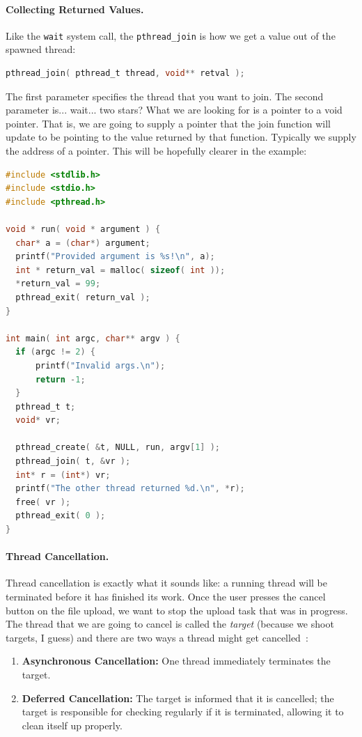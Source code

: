 \documentclass[a4paper]{report}
\begin{document}
\begin{appendices}
\paragraph{Collecting Returned Values.} Like the \texttt{wait} system call, the \texttt{pthread\_join} is how we get a value out of the spawned thread:

\begin{lstlisting}[language=C]
pthread_join( pthread_t thread, void** retval );
\end{lstlisting}

The first parameter specifies the thread that you want to join. The second parameter is... wait... two stars? What we are looking for is a pointer to a void pointer. That is, we are going to supply a pointer that the join function will update to be pointing to the value returned by that function. Typically we supply the address of a pointer. This will be hopefully clearer in the example:

\begin{lstlisting}[language=C]
#include <stdlib.h>
#include <stdio.h>
#include <pthread.h>

void * run( void * argument ) { 
  char* a = (char*) argument;
  printf("Provided argument is %s!\n", a); 
  int * return_val = malloc( sizeof( int )); 
  *return_val = 99; 
  pthread_exit( return_val );
}

int main( int argc, char** argv ) { 
  if (argc != 2) {
      printf("Invalid args.\n");
      return -1; 
  }
  pthread_t t;
  void* vr; 
  
  pthread_create( &t, NULL, run, argv[1] );
  pthread_join( t, &vr );
  int* r = (int*) vr; 
  printf("The other thread returned %d.\n", *r);
  free( vr );
  pthread_exit( 0 );
}
\end{lstlisting}

\paragraph{Thread Cancellation.}
Thread cancellation is exactly what it sounds like: a running thread will be terminated before it has finished its work. Once the user presses the cancel button on the file upload, we want to stop the upload task that was in progress. The thread that we are going to cancel is called the \textit{target} (because we shoot targets, I guess) and there are two ways a thread might get cancelled~\cite{osc}:

\begin{enumerate}
	\item \textbf{Asynchronous Cancellation:} One thread immediately terminates the target.
	\item \textbf{Deferred Cancellation:} The target is informed that it is cancelled; the target is responsible for checking regularly if it is terminated, allowing it to clean itself up properly. 
\end{enumerate}


\end{appendices}
\end{document}
